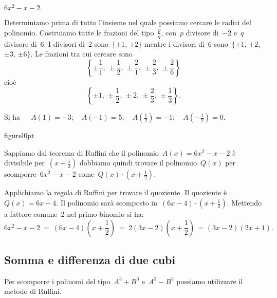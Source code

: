 \begin{exrig}
\begin{esempio}
$6x^{2}-x-2.$
\end{esempio}

Determiniamo prima di tutto l'insieme nel quale
possiamo cercare le radici del polinomio. Costruiamo tutte le frazioni
del tipo~$\frac{p}{q}$, con~$p$ divisore di~$-2$ e~$q$ divisore di~$6$. I
divisori di~2 sono~$\{\pm 1$, $\pm 2\}$ mentre i divisori di~6 sono~$\{\pm 1$, $\pm 2$, $\pm 3$, $\pm 6\}$.
Le frazioni tra cui cercare sono
\[\left\{\pm {\frac{1}{1}}\text{, }\pm \frac{1}{2}\text{, }\pm \frac{2}{1}\text{, }\pm
\frac{2}{3}\text{, }\pm \frac{2}{6}\right\}\]
cioè \[\left\{\pm 1\text{, }\pm\frac{1}{2}\text{, }\pm 2\text{, }\pm \frac{2}{3}\text{, }\pm \frac{1}{3}\right\}.\]

Si ha~$\quad A(1)=-3;\quad A(-1)=5;\quad A\left(\frac{1}{2}\right)=-1;\quad A\left(-{\frac{1}{2}}\right)=0$.

\begin{wrapfloat}{figure}{l}{0pt}
 
\end{wrapfloat}
Sappiamo dal teorema di Ruffini che il polinomio~$A(x)=6x^{2}-x-2$ è
divisibile per~$\left(x+\frac{1}{2}\right)$ dobbiamo quindi trovare il
polinomio~$Q(x)$ per scomporre~$6x^{2}-x-2$ come~$Q(x)\cdot \left(x+\frac{1}{2}\right)$.

Applichiamo la regola di Ruffini per trovare il quoziente. Il quoziente è~$Q(x)=6x-4$.
Il polinomio sarà scomposto in~$(6x-4)\cdot\left(x+\frac{1}{2}\right)$.
Mettendo a fattore comune~2 nel primo binomio si ha:
\[6x^{2}-x-2\ =\ (6x-4)%
\left(x+\frac{1}{2}\right)\ =\ 2(3x-2)\left(x+\frac{1}{2}\right)\ =(3x-2)(2x+1).\]
\end{exrig}

\ovalbox{\risolvii \ref{ese:13.67}, \ref{ese:13.68}, \ref{ese:13.69}, \ref{ese:13.70}, \ref{ese:13.71}}

\subsection{Somma e differenza di due cubi}

Per scomporre i polinomi del tipo~$A^{3}+B^{3}$ e~$A^{3}-B^{3}$
possiamo utilizzare il metodo di Ruffini.

